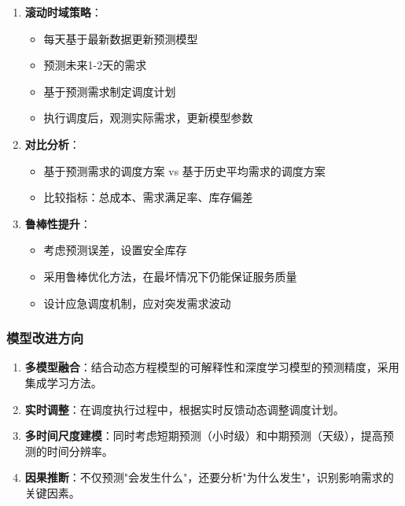 \documentclass[12pt,a4paper]{ctexart}
\begin{document}
\begin{enumerate}
    \item \textbf{滚动时域策略}：
    \begin{itemize}
        \item 每天基于最新数据更新预测模型
        \item 预测未来1-2天的需求
        \item 基于预测需求制定调度计划
        \item 执行调度后，观测实际需求，更新模型参数
    \end{itemize}

    \item \textbf{对比分析}：
    \begin{itemize}
        \item 基于预测需求的调度方案 vs 基于历史平均需求的调度方案
        \item 比较指标：总成本、需求满足率、库存偏差
    \end{itemize}

    \item \textbf{鲁棒性提升}：
    \begin{itemize}
        \item 考虑预测误差，设置安全库存
        \item 采用鲁棒优化方法，在最坏情况下仍能保证服务质量
        \item 设计应急调度机制，应对突发需求波动
    \end{itemize}
\end{enumerate}

\subsubsection{模型改进方向}

\begin{enumerate}
    \item \textbf{多模型融合}：结合动态方程模型的可解释性和深度学习模型的预测精度，采用集成学习方法。

    \item \textbf{实时调整}：在调度执行过程中，根据实时反馈动态调整调度计划。

    \item \textbf{多时间尺度建模}：同时考虑短期预测（小时级）和中期预测（天级），提高预测的时间分辨率。

    \item \textbf{因果推断}：不仅预测"会发生什么"，还要分析"为什么发生"，识别影响需求的关键因素。
\end{enumerate}
\end{document}
